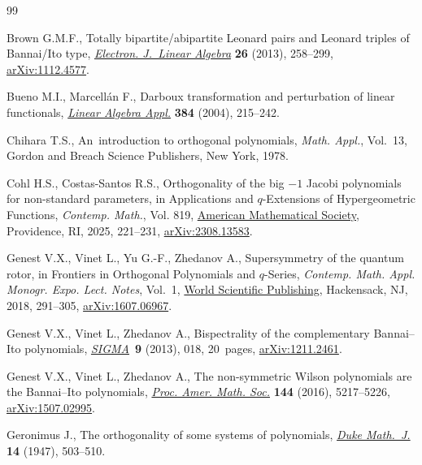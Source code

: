 \documentclass[10pt,a4paper]{amsart}
\numberwithin{equation}{section}
\begin{document}
\begin{thebibliography}{99}
\footnotesize\itemsep=0pt

Brown G.M.F., Totally bipartite/abipartite {L}eonard pairs and {L}eonard
 triples of {B}annai/{I}to type,
 \href{https://doi.org/10.13001/1081-3810.1654}{\textit{Electron. J.~Linear
 Algebra}} \textbf{26} (2013), 258--299,
 \href{http://arxiv.org/abs/1112.4577}{arXiv:1112.4577}.

Bueno M.I., Marcell\'an F., Darboux transformation and perturbation of linear
 functionals, \href{https://doi.org/10.1016/j.laa.2004.02.004}{\textit{Linear
 Algebra Appl.}} \textbf{384} (2004), 215--242.

Chihara T.S., An~introduction to orthogonal polynomials, \textit{Math. Appl.},
 Vol.~13, Gordon and Breach Science Publishers, New York, 1978.

Cohl H.S., Costas-Santos R.S., Orthogonality of the big {$-1$} {J}acobi
 polynomials for non-standard parameters, in Applications and {$q$}-Extensions
 of Hypergeometric Functions, \textit{Contemp. Math.}, Vol. 819,
 \href{https://doi.org/10.1090/conm/819/16395}{American Mathematical Society},
 Providence, RI, 2025, 221--231,
 \href{http://arxiv.org/abs/2308.13583}{arXiv:2308.13583}.

Genest V.X., Vinet L., Yu G.-F., Zhedanov A., Supersymmetry of the quantum
 rotor, in Frontiers in Orthogonal Polynomials and {$q$}-Series,
 \textit{Contemp. Math. Appl. Monogr. Expo. Lect. Notes}, Vol.~1,
 \href{https://doi.org/10.1142/9789813228887_0015}{World Scientific
 Publishing}, Hackensack, NJ, 2018, 291--305,
 \href{http://arxiv.org/abs/1607.06967}{arXiv:1607.06967}.

Genest V.X., Vinet L., Zhedanov A., Bispectrality of the complementary
 {B}annai--{I}to polynomials,
 \href{https://doi.org/10.3842/SIGMA.2013.018}{\textit{SIGMA}}~\textbf{9}
 (2013), 018, 20~pages,
 \href{http://arxiv.org/abs/1211.2461}{arXiv:1211.2461}.

Genest V.X., Vinet L., Zhedanov A., The non-symmetric {W}ilson polynomials are
 the {B}annai--{I}to polynomials,
 \href{https://doi.org/10.1090/proc/13141}{\textit{Proc. Amer. Math. Soc.}}
 \textbf{144} (2016), 5217--5226,
 \href{http://arxiv.org/abs/1507.02995}{arXiv:1507.02995}.

Geronimus J., The orthogonality of some systems of polynomials,
 \href{https://doi.org/10.1215/S0012-7094-47-01441-5}{\textit{Duke Math.~J.}}
 \textbf{14} (1947), 503--510.


\end{thebibliography}
\end{document}
